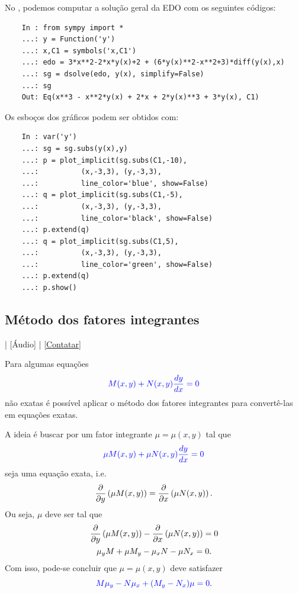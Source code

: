 \begin{ex}
  \ifispython
  No \python, podemos computar a solução geral da EDO com os seguintes códigos:
  \begin{lstlisting}
    In : from sympy import *
    ...: y = Function('y')
    ...: x,C1 = symbols('x,C1')
    ...: edo = 3*x**2-2*x*y(x)+2 + (6*y(x)**2-x**2+3)*diff(y(x),x)
    ...: sg = dsolve(edo, y(x), simplify=False)
    ...: sg
    Out: Eq(x**3 - x**2*y(x) + 2*x + 2*y(x)**3 + 3*y(x), C1)
  \end{lstlisting}
  Os esboços dos gráficos podem ser obtidos com:
  \begin{lstlisting}
    In : var('y')
    ...: sg = sg.subs(y(x),y)
    ...: p = plot_implicit(sg.subs(C1,-10),
    ...:          (x,-3,3), (y,-3,3),
    ...:          line_color='blue', show=False)
    ...: q = plot_implicit(sg.subs(C1,-5),
    ...:          (x,-3,3), (y,-3,3),
    ...:          line_color='black', show=False)
    ...: p.extend(q)
    ...: q = plot_implicit(sg.subs(C1,5),
    ...:          (x,-3,3), (y,-3,3),
    ...:          line_color='green', show=False)
    ...: p.extend(q)
    ...: p.show()
  \end{lstlisting}
  \fi
\end{ex}

\subsection{Método dos fatores integrantes}

\begin{flushright}
  [Vídeo] | [Áudio] | \href{https://phkonzen.github.io/notas/contato.html}{[Contatar]}
\end{flushright}

Para algumas equações
\begin{equation}\label{eq:eqnexata}
  {\color{blue}M(x,y) + N(x,y)\frac{dy}{dx} = 0}
\end{equation}
não exatas é possível aplicar o método dos fatores integrantes para convertê-las em equações exatas.

A ideia é buscar por um fator integrante $\mu = \mu(x,y)$ tal que
\begin{equation}
  {\color{blue}\mu M(x,y) + \mu N(x,y)\frac{dy}{dx} = 0}
\end{equation}
seja uma equação exata, i.e.
\begin{equation}
  \frac{\partial}{\partial y}\left(\mu M(x,y)\right) = \frac{\partial}{\partial x}\left(\mu N(x,y)\right).
\end{equation}
Ou seja, $\mu$ deve ser tal que
\begin{gather}
  \frac{\partial}{\partial y}\left(\mu M(x,y)\right) - \frac{\partial}{\partial x}\left(\mu N(x,y)\right) = 0 \\
  \mu_y M + \mu M_y - \mu_x N - \mu N_x = 0.
\end{gather}
Com isso, pode-se concluir que $\mu = \mu(x,y)$ deve satisfazer
\begin{equation}\label{eq:eqexata_fatorint}
  {\color{blue}M\mu_y - N\mu_x + (M_y - N_x)\mu = 0}.
\end{equation}

